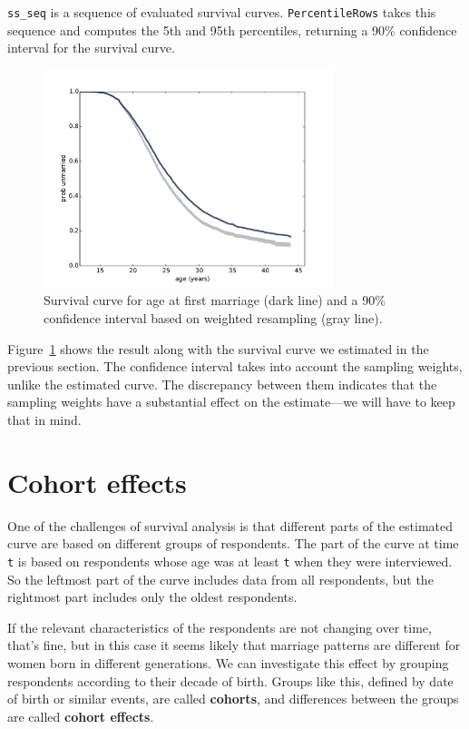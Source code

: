 \documentclass[12pt]{book}
\begin{document}
\verb"ss_seq" is a sequence of evaluated survival curves.
{\tt PercentileRows} takes this sequence and computes the 5th and 95th
percentiles, returning a 90\% confidence interval for the survival
curve.

\begin{figure}
\centerline{\includegraphics[height=2.5in]{figs/survival3.pdf}}
\caption{Survival curve for age at first marriage (dark line) and a 90\%
confidence interval based on weighted resampling (gray line).}
\label{survival3}
\end{figure}

Figure~\ref{survival3} shows the result along with the survival
curve we estimated in the previous section.  The confidence
interval takes into account the sampling weights, unlike the estimated
curve.  The discrepancy between them indicates that the sampling
weights have a substantial effect on the estimate---we will have
to keep that in mind.


\section{Cohort effects}

One of the challenges of survival analysis is that different parts
of the estimated curve are based on different groups of respondents.
The part of the curve at time {\tt t} is based on respondents
whose age was at least {\tt t} when they were interviewed.
So the leftmost part of the curve includes data from all respondents,
but the rightmost part includes only the oldest respondents.

If the relevant characteristics of the respondents are not changing
over time, that's fine, but in this case it seems likely that marriage
patterns are different for women born in different generations.
We can investigate this effect by grouping respondents according
to their decade of birth.  Groups like this, defined by date of
birth or similar events, are called {\bf cohorts}, and differences
between the groups are called {\bf cohort effects}.
\end{document}

